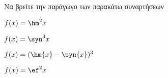 Να βρείτε την παράγωγο των παρακάτω συναρτήσεων
\begin{multicols}{2}
\begin{alist}
\item $ f(x)=\hm^2{x} $
\item $ f(x)=\syn^3{x} $
\item $ f(x)=(\hm{x}-\syn{x})^3 $
\item $ f(x)=\ef^2{x} $
\end{alist}
\end{multicols}
